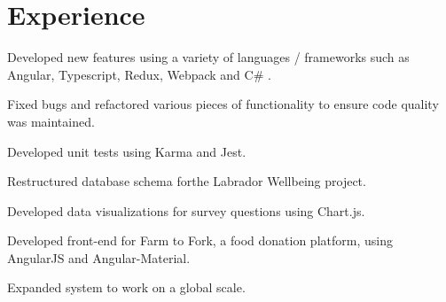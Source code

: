 \documentclass[]{chris_katsaras_resume}
\begin{document}
%
%



%
%

\hfill
\begin{minipage}[t]{1\textwidth} 


\section{Experience}

\vspace{\topsep}
\begin{tightemize}\item Developed new features using a variety of languages / frameworks such as Angular, Typescript, Redux, Webpack and C\# .
\item Fixed bugs and refactored various pieces of functionality to ensure code quality was maintained. 
\item Developed unit tests using Karma and Jest.

\end{tightemize}
\sectionsep

\begin{tightemize}
\item Restructured database schema forthe Labrador Wellbeing project.\item Developed data visualizations for survey questions using Chart.js.\end{tightemize}
\sectionsep

\begin{tightemize}
\item Developed front-end for Farm to Fork, a food donation platform, using AngularJS and Angular-Material. \item Expanded system to work on a global scale. \end{tightemize}
\sectionsep


\end{minipage}
\end{document}
